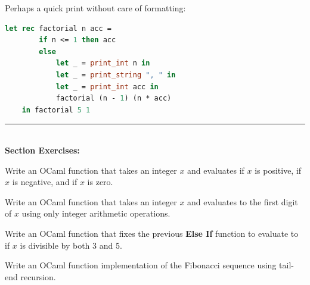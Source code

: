 \noindent
Perhaps a quick print without care of formatting:

\begin{lstlisting}[language=OCaml, caption={Dirty Print Debugging}]
    let rec factorial n acc =
        if n <= 1 then acc
        else 
            let _ = print_int n in
            let _ = print_string ", " in
            let _ = print_int acc in
            factorial (n - 1) (n * acc)
    in factorial 5 1
\end{lstlisting}

\vspace{1em}
\noindent
\rule{\textwidth}{0.4pt}\\
\textbf{Section Exercises:}\\

\begin{Exercise}
Write an OCaml function that takes an integer $x$ and evaluates  if $x$ is positive,  if $x$ is negative, and  if $x$ is zero.
\end{Exercise}
    
    
\vspace{1em}
\begin{Exercise}
Write an OCaml function that takes an integer $x$ and evaluates to the first digit of $x$ using only integer arithmetic operations.
\end{Exercise}

\vspace{1em}
\begin{Exercise}
Write an OCaml function that fixes the previous \textbf{Else If} function to evaluate to  if $x$ is divisible by both 3 and 5.
\end{Exercise}

\vspace{1em}
\begin{Exercise}
Write an OCaml function implementation of the Fibonacci sequence using tail-end recursion.
\end{Exercise}




